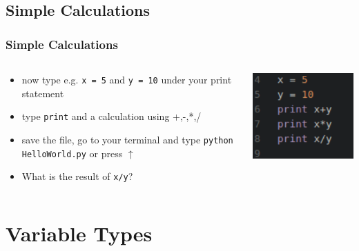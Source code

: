 \documentclass{beamer}
\begin{document}
\subsection{Simple Calculations}

\begin{frame}
\frametitle{Simple Calculations}
	\begin{columns}[T]
		\begin{column}[T]{7cm}
			\begin{itemize}
				\item now type e.g. \texttt{x = 5} and \texttt{y = 10} under your print statement
				\item type \texttt{print} and a calculation using +,-,*,/
				\item save the file, go to your terminal and type \texttt{python HelloWorld.py} or press $\uparrow$
				\item What is the result of \texttt{x/y}?
			\end{itemize}
		\end{column}
		\begin{column}[T]{3cm}
			\includegraphics[width = 1\textwidth]{SimpleCalculations.pdf}
		\end{column}
	\end{columns}
\end{frame}

\section{Variable Types}
\end{document}
